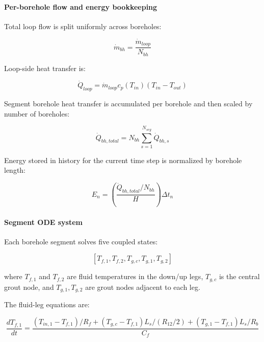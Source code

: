 \paragraph{Per-borehole flow and energy bookkeeping}\label{per-borehole-flow-and-energy-bookkeeping}

Total loop flow is split uniformly across boreholes:

\begin{equation}
\dot m_{bh} = \frac{\dot m_{loop}}{N_{bh}}
\end{equation}

Loop-side heat transfer is:

\begin{equation}
\dot Q_{loop} = \dot m_{loop} c_p(T_{in}) \left(T_{in} - T_{out}\right)
\end{equation}

Segment borehole heat transfer is accumulated per borehole and then scaled by number of boreholes:

\begin{equation}
\dot Q_{bh,total} = N_{bh}\sum_{s=1}^{N_{seg}} \dot Q_{bh,s}
\end{equation}

Energy stored in history for the current time step is normalized by borehole length:

\begin{equation}
E_n = \left(\frac{\dot Q_{bh,total}/N_{bh}}{H}\right)\Delta t_n
\end{equation}

\paragraph{Segment ODE system}\label{segment-ode-system}

Each borehole segment solves five coupled states:

\begin{equation}
\left[T_{f,1},T_{f,2},T_{g,c},T_{g,1},T_{g,2}\right]
\end{equation}

where \(T_{f,1}\) and \(T_{f,2}\) are fluid temperatures in the down/up legs, \(T_{g,c}\) is the central grout node, and \(T_{g,1}, T_{g,2}\) are grout nodes adjacent to each leg.

The fluid-leg equations are:

\begin{equation}
\frac{dT_{f,1}}{dt} = \frac{\left(T_{in,1}-T_{f,1}\right)/R_f + \left(T_{g,c}-T_{f,1}\right)L_s/(R_{12}/2) + \left(T_{g,1}-T_{f,1}\right)L_s/R_b}{C_f}
\end{equation}


